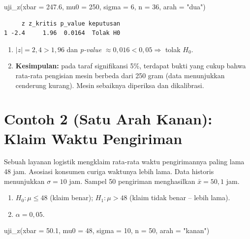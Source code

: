 \documentclass[
  indonesian,
  letterpaper,
]{book}
\newenvironment{Shaded}{\begin{snugshade}}{\end{snugshade}}
\newcommand{\AttributeTok}[1]{\textcolor[rgb]{0.40,0.45,0.13}{#1}}
\newcommand{\DecValTok}[1]{\textcolor[rgb]{0.68,0.00,0.00}{#1}}
\newcommand{\FloatTok}[1]{\textcolor[rgb]{0.68,0.00,0.00}{#1}}
\newcommand{\FunctionTok}[1]{\textcolor[rgb]{0.28,0.35,0.67}{#1}}
\newcommand{\NormalTok}[1]{\textcolor[rgb]{0.00,0.23,0.31}{#1}}
\newcommand{\StringTok}[1]{\textcolor[rgb]{0.13,0.47,0.30}{#1}}
\providecommand{\tightlist}{%
  \setlength{\itemsep}{0pt}\setlength{\parskip}{0pt}}
\begin{document}
\begin{Shaded}
\begin{Highlighting}[]
\FunctionTok{uji\_z}\NormalTok{(}\AttributeTok{xbar =} \FloatTok{247.6}\NormalTok{, }\AttributeTok{mu0 =} \DecValTok{250}\NormalTok{, }\AttributeTok{sigma =} \DecValTok{6}\NormalTok{, }\AttributeTok{n =} \DecValTok{36}\NormalTok{, }\AttributeTok{arah =} \StringTok{"dua"}\NormalTok{)}
\end{Highlighting}
\end{Shaded}

\begin{verbatim}
     z z_kritis p_value keputusan
1 -2.4     1.96  0.0164  Tolak H0
\end{verbatim}

\begin{enumerate}
\def\labelenumi{\arabic{enumi}.}
\setcounter{enumi}{3}
\tightlist
\item
  \(\lvert z \rvert = 2{,}4 > 1{,}96\) dan \emph{p-value}
  \(\approx 0{,}016 < 0{,}05 \Rightarrow\) tolak \(H_0\).
\item
  \textbf{Kesimpulan:} pada taraf signifikansi 5\%, terdapat bukti yang
  cukup bahwa rata-rata pengisian mesin berbeda dari 250 gram (data
  menunjukkan cenderung kurang). Mesin sebaiknya diperiksa dan
  dikalibrasi.
\end{enumerate}

\section{Contoh 2 (Satu Arah Kanan): Klaim Waktu
Pengiriman}\label{contoh-2-satu-arah-kanan-klaim-waktu-pengiriman}

Sebuah layanan logistik mengklaim rata-rata waktu pengirimannya paling
lama 48 jam. Asosiasi konsumen curiga waktunya lebih lama. Data historis
menunjukkan \(\sigma = 10\) jam. Sampel 50 pengiriman menghasilkan
\(\bar{x} = 50{,}1\) jam.

\begin{enumerate}
\def\labelenumi{\arabic{enumi}.}
\tightlist
\item
  \(H_0: \mu \le 48\) (klaim benar); \(H_1: \mu > 48\) (klaim tidak
  benar -- lebih lama).
\item
  \(\alpha = 0{,}05\).
\end{enumerate}

\begin{Shaded}
\begin{Highlighting}[]
\FunctionTok{uji\_z}\NormalTok{(}\AttributeTok{xbar =} \FloatTok{50.1}\NormalTok{, }\AttributeTok{mu0 =} \DecValTok{48}\NormalTok{, }\AttributeTok{sigma =} \DecValTok{10}\NormalTok{, }\AttributeTok{n =} \DecValTok{50}\NormalTok{, }\AttributeTok{arah =} \StringTok{"kanan"}\NormalTok{)}
\end{Highlighting}
\end{Shaded}
\end{document}

